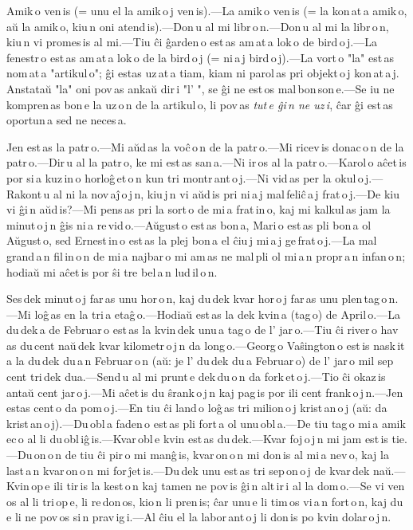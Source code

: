 
Amik\,o ven\,is (= unu el la amik\,o\,j ven\,is).---La amik\,o ven\,is (= la kon\,at\,a amik\,o, aŭ la amik\,o, kiu\,n oni atend\,is).---Don\,u al mi libr\,o\,n.---Don\,u al mi la libr\,o\,n, kiu\,n vi promes\,is al mi.---Tiu ĉi ĝarden\,o est\,as am\,at\,a lok\,o de bird\,o\,j.---La fenestr\,o est\,as am\,at\,a lok\,o de la bird\,o\,j (= ni\,a\,j bird\,o\,j).---La vort\,o "la" est\,as nom\,at\,a "artikul\,o"; ĝi estas uz\,at\,a tiam, kiam ni parol\,as pri objekt\,o\,j kon\,at\,a\,j. Anstataŭ "la" oni pov\,as ankaŭ dir\,i "l' ", se ĝi ne est\,os mal\,bon\,son\,e.---Se iu ne kompren\,as bon\,e la uz\,o\,n de la artikul\,o, li pov\,as \emph{tut\,e ĝi\,n ne uz\,i}, ĉar ĝi est\,as oportun\,a sed ne neces\,a. 



Jen est\,as la patr\,o.---Mi aŭd\,as la voĉ\,o\,n de la patr\,o.---Mi ricev\,is donac\,o\,n de la patr\,o.---Dir\,u al la patr\,o, ke mi est\,as san\,a.---Ni ir\,os al la patr\,o.---Karol\,o aĉet\,is por si\,a kuz\,in\,o horloĝ\,et\,o\,n kun tri montr\,ant\,o\,j.---Ni vid\,as per la okul\,o\,j.---Rakont\,u al ni la nov\,aĵ\,o\,j\,n, kiu\,j\,n vi aŭd\,is pri ni\,a\,j mal\,feliĉ\,a\,j frat\,o\,j.---De kiu vi ĝi\,n aŭd\,is?---Mi pens\,as pri la sort\,o de mi\,a frat\,in\,o, kaj mi kalkul\,as jam la minut\,o\,j\,n ĝis ni\,a re\,vid\,o.---Aŭgust\,o est\,as bon\,a, Mari\,o est\,as pli bon\,a ol Aŭgust\,o, sed Ernest\,in\,o est\,as la plej bon\,a el ĉiu\,j mi\,a\,j ge\,frat\,o\,j.---La mal\,grand\,a\,n fil\,in\,o\,n de mi\,a najbar\,o mi am\,as ne mal\,pli ol mi\,a\,n propr\,a\,n infan\,o\,n; hodiaŭ mi aĉet\,is por ŝi tre bel\,a\,n lud\,il\,o\,n. 



Ses\,dek minut\,o\,j far\,as unu hor\,o\,n, kaj du\,dek kvar hor\,o\,j far\,as unu plen\,tag\,o\,n.---Mi loĝ\,as en la tri\,a etaĝ\,o.---Hodiaŭ est\,as la dek kvin\,a (tag\,o) de April\,o.---La du\,dek\,a de Februar\,o est\,as la kvin\,dek unu\,a tag\,o de l' jar\,o.---Tiu ĉi river\,o hav\,as du\,cent naŭ\,dek kvar kilometr\,o\,j\,n da long\,o.---Georg\,o Vaŝington\,o est\,is nask\,it\,a la du\,dek du\,a\,n Februar\,o\,n (aŭ: je l' du\,dek du\,a Februar\,o) de l' jar\,o mil sep\,cent tri\,dek dua.---Send\,u al mi prunt\,e dek\,du\,o\,n da fork\,et\,o\,j.---Tio ĉi okaz\,is antaŭ cent jar\,o\,j.---Mi aĉet\,is du ŝrank\,o\,j\,n kaj pag\,is por ili cent frank\,o\,j\,n.---Jen estas cent\,o da pom\,o\,j.---En tiu ĉi land\,o loĝ\,as tri milion\,o\,j krist\,an\,o\,j (aŭ: da krist\,an\,o\,j).---Du\,obl\,a faden\,o est\,as pli fort\,a ol unu\,obl\,a.---De tiu tag\,o mi\,a amik\,ec\,o al li du\,obl\,iĝ\,is.---Kvar\,obl\,e kvin est\,as du\,dek.---Kvar foj\,o\,j\,n mi jam est\,is tie.---Du\,on\,o\,n de tiu ĉi pir\,o mi manĝ\,is, kvar\,on\,o\,n mi don\,is al mi\,a nev\,o, kaj la last\,a\,n kvar\,on\,o\,n mi for\,ĵet\,is.---Du\,dek unu est\,as tri sep\,on\,o\,j de kvar\,dek naŭ.---Kvin\,op\,e ili tir\,is la kest\,o\,n kaj tamen ne pov\,is ĝi\,n alt\,ir\,i al la dom\,o.---Se vi ven\,os al li tri\,op\,e, li re\,don\,os, kio\,n li pren\,is; ĉar unu\,e li tim\,os vi\,a\,n fort\,o\,n, kaj du\,e li ne pov\,os si\,n prav\,ig\,i.---Al ĉiu el la labor\,ant\,o\,j li don\,is po kvin dolar\,o\,j\,n. 


